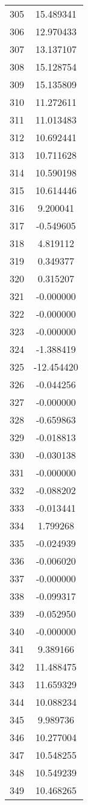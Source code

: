 \documentclass[12pt]{article}
\begin{document}
\begin{longtable}{@{}cc@{}}
305 & 15.489341 \\
306 & 12.970433 \\
307 & 13.137107 \\
308 & 15.128754 \\
309 & 15.135809 \\
310 & 11.272611 \\
311 & 11.013483 \\
312 & 10.692441 \\
313 & 10.711628 \\
314 & 10.590198 \\
315 & 10.614446 \\
316 & 9.200041 \\
317 & -0.549605 \\
318 & 4.819112 \\
319 & 0.349377 \\
320 & 0.315207 \\
321 & -0.000000 \\
322 & -0.000000 \\
323 & -0.000000 \\
324 & -1.388419 \\
325 & -12.454420 \\
326 & -0.044256 \\
327 & -0.000000 \\
328 & -0.659863 \\
329 & -0.018813 \\
330 & -0.030138 \\
331 & -0.000000 \\
332 & -0.088202 \\
333 & -0.013441 \\
334 & 1.799268 \\
335 & -0.024939 \\
336 & -0.006020 \\
337 & -0.000000 \\
338 & -0.099317 \\
339 & -0.052950 \\
340 & -0.000000 \\
341 & 9.389166 \\
342 & 11.488475 \\
343 & 11.659329 \\
344 & 10.088234 \\
345 & 9.989736 \\
346 & 10.277004 \\
347 & 10.548255 \\
348 & 10.549239 \\
349 & 10.468265 \\

\end{longtable}
\end{document}
